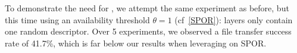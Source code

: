 To demonstrate the need for , 
we attempt the same experiment as before, but this time using an availability threshold $\theta = 1$ (cf~\ref{SPOR}): 
layers only contain one random descriptor.
Over 5 experiments, we observed a file transfer success rate of 41.7\%, which is far below our results when leveraging on \ac{SPOR}.














